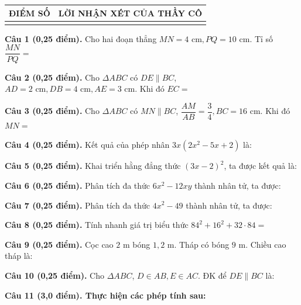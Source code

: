 \documentclass[12pt,a4paper]{article}
\begin{document}
\vspace{1.0mm}

\noindent
\begin{tabularx}{\linewidth}{|p{3.2cm}|X|}
\hline
\centering\textbf{ĐIỂM SỐ} & \centering\textbf{LỜI NHẬN XÉT CỦA THẦY CÔ} \tabularnewline
\hline
\rule{0pt}{1.8cm} & \tabularnewline
\hline
\end{tabularx}

\vspace{1.2mm}
\noindent\textbf{Câu 1 (0,25 điểm).} Cho hai đoạn thẳng $MN = 4\text{ cm}, PQ = 10\text{ cm}$. Tỉ số $\dfrac{MN}{PQ} =$ \par\vspace{3.0mm}
\noindent\textbf{Câu 2 (0,25 điểm).} Cho $\Delta ABC$ có $DE \parallel BC$, $AD = 2\text{ cm}, DB = 4\text{ cm}, AE = 3\text{ cm}$. Khi đó $EC =$ \par\vspace{3.0mm}
\noindent\textbf{Câu 3 (0,25 điểm).} Cho $\Delta ABC$ có $MN \parallel BC$, $\dfrac{AM}{AB} = \dfrac{3}{4}, BC = 16\text{ cm}$. Khi đó $MN =$ \par\vspace{3.0mm}
\noindent\textbf{Câu 4 (0,25 điểm).} Kết quả của phép nhân $3x(2x^2 - 5x + 2)$ là: \par\vspace{3.0mm}
\noindent\textbf{Câu 5 (0,25 điểm).} Khai triển hằng đẳng thức $(3x - 2)^2$, ta được kết quả là: \par\vspace{3.0mm}
\noindent\textbf{Câu 6 (0,25 điểm).} Phân tích đa thức $6x^2 - 12xy$ thành nhân tử, ta được: \par\vspace{3.0mm}
\noindent\textbf{Câu 7 (0,25 điểm).} Phân tích đa thức $4x^2 - 49$ thành nhân tử, ta được: \par\vspace{3.0mm}
\noindent\textbf{Câu 8 (0,25 điểm).} Tính nhanh giá trị biểu thức $84^2 + 16^2 + 32 \cdot 84 =$ \par\vspace{3.0mm}
\noindent\textbf{Câu 9 (0,25 điểm).} Cọc cao $2\text{ m}$ bóng $1{,}2\text{ m}$. Tháp có bóng $9\text{ m}$. Chiều cao tháp là: \par\vspace{3.0mm}
\noindent\textbf{Câu 10 (0,25 điểm).} Cho $\Delta ABC$, $D \in AB, E \in AC$. ĐK để $DE \parallel BC$ là: \par\vspace{3.0mm}
\vspace{0.4mm}
\noindent\textbf{Câu 11 (3,0 điểm). Thực hiện các phép tính sau:}
\vspace{0.6mm}
\end{document}
